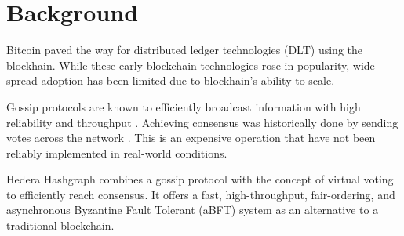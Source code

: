\section{Background}

Bitcoin \cite{nakamoto2008peer} paved the way for distributed ledger technologies (DLT) using the blockhain. While these early blockchain technologies rose in popularity, wide-spread adoption has been limited due to blockhain's ability to scale. 


Gossip protocols are known to efficiently broadcast information with high reliability and throughput \cite{birman}. Achieving consensus was historically done by sending votes across the network \cite{berman1989towards}. This is an expensive operation that have not been reliably implemented in real-world conditions.

Hedera Hashgraph\cite{baird2016} combines a gossip protocol with the concept of virtual voting to efficiently reach consensus. It offers a fast, high-throughput, fair-ordering, and asynchronous Byzantine Fault Tolerant (aBFT) system as an alternative to a traditional blockchain.
